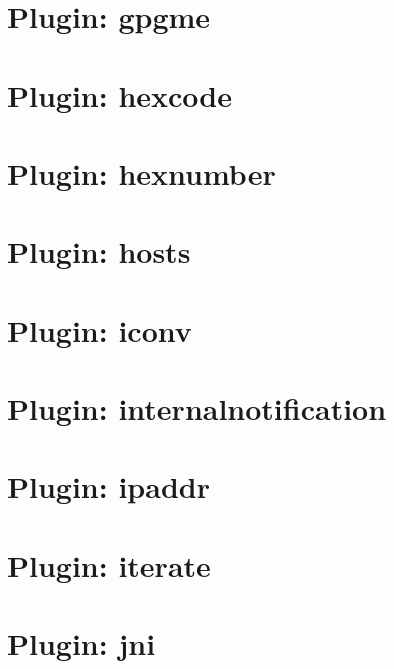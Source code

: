 \let\mypdfximage\pdfximage\def\pdfximage{\immediate\mypdfximage}\documentclass[twoside]{book}
\newcommand{\+}{\discretionary{\mbox{\scriptsize$\hookleftarrow$}}{}{}}
\begin{document}
\chapter{Plugin\+: gpgme}
\label{md_src_plugins_gpgme_README}

\chapter{Plugin\+: hexcode}
\label{md_src_plugins_hexcode_README}

\chapter{Plugin\+: hexnumber}
\label{md_src_plugins_hexnumber_README}

\chapter{Plugin\+: hosts}
\label{md_src_plugins_hosts_README}

\chapter{Plugin\+: iconv}
\label{md_src_plugins_iconv_README}

\chapter{Plugin\+: internalnotification}
\label{md_src_plugins_internalnotification_README}

\chapter{Plugin\+: ipaddr}
\label{md_src_plugins_ipaddr_README}

\chapter{Plugin\+: iterate}
\label{md_src_plugins_iterate_README}

\chapter{Plugin\+: jni}
\label{md_src_plugins_jni_README}

\end{document}
